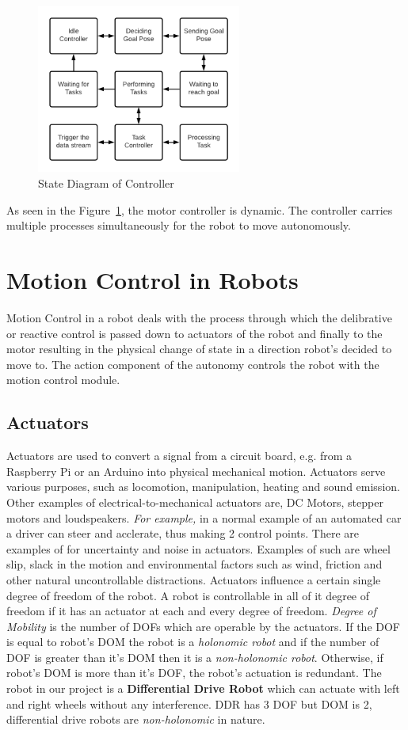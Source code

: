 \begin{figure}[th]
    \centering
    \includegraphics[width=0.6\textwidth]{Figures/controller-process.png}
    \decoRule
    \caption[]{State Diagram of Controller}
    \label{fig:StateDiagController}
\end{figure}

As seen in the Figure~\ref{fig:StateDiagController}, the motor controller is dynamic. The controller carries multiple processes simultaneously for the robot to move autonomously.

\section{Motion Control in Robots}
Motion Control in a robot deals with the process through which the delibrative or reactive control is passed down to actuators of the robot and finally to the motor resulting in the physical change of state in a direction robot's decided to move to. The action component of the autonomy controls the robot with the motion control module.
\subsection{Actuators}
Actuators are used to convert a signal from a circuit board, e.g. from a Raspberry Pi or an Arduino into physical mechanical motion. Actuators serve various purposes, such as locomotion, manipulation, heating and sound emission. 
Other examples of electrical-to-mechanical actuators are, DC Motors, stepper motors and loudspeakers. \textit{For example, } in a normal example of an automated car a driver can steer and acclerate, thus making 2 control points.
There are examples of for uncertainty and noise in actuators. Examples of such are wheel slip, slack in the motion and environmental factors such as wind, friction and other natural uncontrollable distractions. Actuators influence a certain single degree of freedom of the robot.
A robot is controllable in all of it degree of freedom if it has an actuator at each and every degree of freedom. \textit{Degree of Mobility } is the number of DOFs which are operable by the actuators. If the DOF is equal to robot's DOM the robot is a \textit{holonomic robot} and if the number of DOF is greater than it's DOM then it is a \textit{non-holonomic robot}. Otherwise, if robot's DOM is more than it's DOF, the robot's actuation is redundant.
The robot in our project is a \textbf{Differential Drive Robot} which can actuate with left and right wheels without any interference. DDR has 3 DOF but DOM is 2, differential drive robots are \textit{non-holonomic} in nature.  
